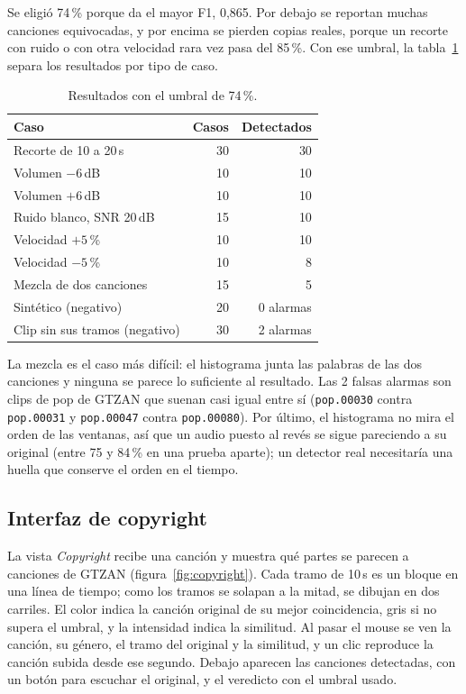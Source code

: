 \documentclass[11pt,a4paper]{article}
\begin{document}
Se eligió 74\,\% porque da el mayor F1, 0,865. Por debajo se reportan muchas canciones equivocadas, y por encima se pierden copias reales, porque un recorte con ruido o con otra velocidad rara vez pasa del 85\,\%. Con ese umbral, la tabla~\ref{tab:copyright-casos} separa los resultados por tipo de caso.

\begin{table}[H]
\centering
\small
\begin{tabular}{lrr}
\toprule
Caso & Casos & Detectados \\
\midrule
Recorte de 10 a 20\,s & 30 & 30 \\
Volumen $-6$\,dB & 10 & 10 \\
Volumen $+6$\,dB & 10 & 10 \\
Ruido blanco, SNR 20\,dB & 15 & 10 \\
Velocidad $+5$\,\% & 10 & 10 \\
Velocidad $-5$\,\% & 10 & 8 \\
Mezcla de dos canciones & 15 & 5 \\
Sintético (negativo) & 20 & 0 alarmas \\
Clip sin sus tramos (negativo) & 30 & 2 alarmas \\
\bottomrule
\end{tabular}
\caption{Resultados con el umbral de 74\,\%.}
\label{tab:copyright-casos}
\end{table}

La mezcla es el caso más difícil: el histograma junta las palabras de las dos canciones y ninguna se parece lo suficiente al resultado. Las 2 falsas alarmas son clips de pop de GTZAN que suenan casi igual entre sí (\texttt{pop.00030} contra \texttt{pop.00031} y \texttt{pop.00047} contra \texttt{pop.00080}). Por último, el histograma no mira el orden de las ventanas, así que un audio puesto al revés se sigue pareciendo a su original (entre 75 y 84\,\% en una prueba aparte); un detector real necesitaría una huella que conserve el orden en el tiempo.

\subsection{Interfaz de copyright}
\label{sec:copyright-interfaz}

La vista \emph{Copyright} recibe una canción y muestra qué partes se parecen a canciones de GTZAN (figura~\ref{fig:copyright}). Cada tramo de 10\,s es un bloque en una línea de tiempo; como los tramos se solapan a la mitad, se dibujan en dos carriles. El color indica la canción original de su mejor coincidencia, gris si no supera el umbral, y la intensidad indica la similitud. Al pasar el mouse se ven la canción, su género, el tramo del original y la similitud, y un clic reproduce la canción subida desde ese segundo. Debajo aparecen las canciones detectadas, con un botón para escuchar el original, y el veredicto con el umbral usado.
\end{document}

